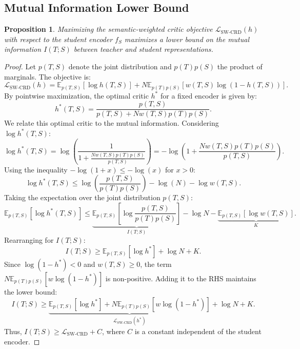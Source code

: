 \documentclass{article}
\theoremstyle{plain}
\newtheorem{proposition}{Proposition}
\theoremstyle{remark}
\begin{document}
\subsection{Mutual Information Lower Bound}

\begin{proposition}
    \label{prop:mi-lower-bound}
    Maximizing the semantic-weighted critic objective $\mathcal{L}_{\text{SW-CRD}}(h)$ with respect to the student encoder $f_S$ maximizes a lower bound on the mutual information $I(T;S)$ between teacher and student representations.
\end{proposition}

\begin{proof}
    Let $p(T,S)$ denote the joint distribution and $p(T)p(S)$ the product of marginals. The objective is:
    \begin{equation}
        \mathcal{L}_{\text{SW-CRD}}(h) = \mathbb{E}_{p(T,S)}[\log h(T,S)] + N \mathbb{E}_{p(T)p(S)}[w(T,S) \log(1 - h(T,S))].
    \end{equation}
    By pointwise maximization, the optimal critic $h^*$ for a fixed encoder is given by:
    \begin{equation}
        h^*(T,S) = \frac{p(T,S)}{p(T,S) + N w(T,S) p(T)p(S)}.
    \end{equation}
    We relate this optimal critic to the mutual information. Considering $\log h^*(T,S)$:
    \begin{equation}
        \log h^*(T,S) 
        = \log \left( \frac{1}{1 + \frac{N w(T,S) p(T)p(S)}{p(T,S)}} \right) 
        = - \log \left( 1 + \frac{N w(T,S) p(T)p(S)}{p(T,S)} \right).
    \end{equation}
    Using the inequality $-\log(1+x) \leq -\log(x)$ for $x>0$:
    \begin{equation}
        \log h^*(T,S) 
        \leq \log \left( \frac{p(T,S)}{p(T)p(S)} \right) - \log(N) - \log w(T,S).
    \end{equation}
    Taking the expectation over the joint distribution $p(T,S)$:
    \begin{equation}
        \mathbb{E}_{p(T,S)}[\log h^*(T,S)] 
        \leq \underbrace{\mathbb{E}_{p(T,S)} \left[ \log \frac{p(T,S)}{p(T)p(S)} \right]}_{I(T;S)} - \log N - \underbrace{\mathbb{E}_{p(T,S)}[\log w(T,S)]}_{K}.
    \end{equation}
    Rearranging for $I(T;S)$:
    \begin{equation}
        I(T;S) \geq \mathbb{E}_{p(T,S)}[\log h^*] + \log N + K.
    \end{equation}
    Since $\log(1-h^*) < 0$ and $w(T,S) \geq 0$, the term $N \mathbb{E}_{p(T)p(S)}[w \log(1-h^*)]$ is non-positive. Adding it to the RHS maintains the lower bound:
    \begin{equation}
        I(T;S) \geq \underbrace{\mathbb{E}_{p(T,S)}[\log h^*] + N \mathbb{E}_{p(T)p(S)}[w \log(1-h^*)]}_{\mathcal{L}_{\text{SW-CRD}}(h^*)} + \log N + K.
    \end{equation}
    Thus, $I(T;S) \geq \mathcal{L}_{\text{SW-CRD}} + C$, where $C$ is a constant independent of the student encoder.
\end{proof}
\end{document}
